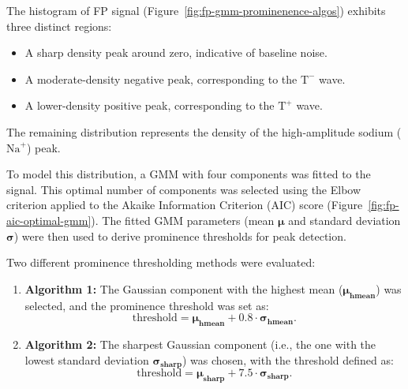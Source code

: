 \documentclass{report}
\begin{document}
            The histogram of FP signal  (Figure~\ref{fig:fp-gmm-prominenence-algos}) exhibits three distinct regions:
            \begin{itemize}
                \item A sharp density peak around zero, indicative of baseline noise.
                \item A moderate-density negative peak, corresponding to the \(\text{T}^-\) wave.
                \item A lower-density positive peak, corresponding to the \(\text{T}^+\) wave.
            \end{itemize}

            
            The remaining distribution represents the density of the high-amplitude sodium (\(\text{Na}^+\)) peak.
            
            To model this distribution, a GMM with four components was fitted to the signal. This optimal number of components was selected using the Elbow criterion \cite{thorndike1953hierarchical} applied to the Akaike Information Criterion (AIC) \cite{Akaike_information_criterion} score (Figure~\ref{fig:fp-aic-optimal-gmm}). The fitted GMM parameters (mean \(\bm{\mu}\) and standard deviation \(\bm{\sigma}\)) were then used to derive prominence thresholds for peak detection.
            
            Two different prominence thresholding methods were evaluated:
            
            \begin{enumerate}
                \item \textbf{Algorithm 1:} The Gaussian component with the highest mean (\(\bm{\mu_{\text{hmean}}}\)) was selected, and the prominence threshold was set as:
                \[
                \text{threshold} = \bm{\mu_{\text{hmean}}} + 0.8 \cdot \bm{\sigma_{\text{hmean}}}.
                \]
            
                \item \textbf{Algorithm 2:} The sharpest Gaussian component (i.e., the one with the lowest standard deviation \(\bm{\sigma_{\text{sharp}}}\)) was chosen, with the threshold defined as:
                \[
                \text{threshold} = \bm{\mu_{\text{sharp}}} + 7.5 \cdot \bm{\sigma_{\text{sharp}}}.
                \]
            \end{enumerate}

            
\end{document}
